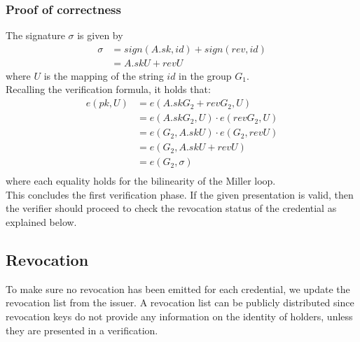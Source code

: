 \subsubsection{Proof of correctness}
The signature $\sigma$ is given by
\begin{equation*}
\begin{split}
    \sigma &= sign(A.sk, id) + sign(rev, id) \\
     &= A.sk U + rev U
\end{split}
\end{equation*}
where $U$ is the mapping of the string $id$ in the group $G_1$.\\
Recalling the verification formula, it holds that:
\begin{equation*}
\begin{split}
 e(pk, U) &= e(A.skG_2 + revG_2, U) \\
 &= e(A.skG_2, U) \cdot e(revG_2, U) \\
 &= e(G_2, A.sk U) \cdot e(G_2, rev U) \\
 &= e(G_2, A.sk U + rev U) \\
 &= e(G_2, \sigma) \\
\end{split}
\end{equation*}
where each equality holds for the bilinearity of the Miller loop.\\

This concludes the first verification phase. If the given presentation is valid, then the verifier should proceed to check the revocation status of the credential as explained below.

\subsection{Revocation}

To make sure no revocation has been emitted for each credential, we update the revocation list from the issuer. A revocation list can be publicly distributed since revocation keys do not provide any information on the identity of holders, unless they are presented in a verification.

